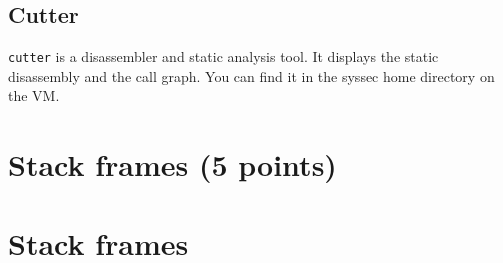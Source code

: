 \documentclass[a4paper,11pt]{article}
\begin{document}
\subsection*{Cutter}

\texttt{cutter} is a disassembler and static analysis tool. It displays the static disassembly and the call graph. You can find it in the syssec home directory on the VM.

\ifsolution 
\section*{Stack frames (5 points)}
\else
\section*{Stack frames}
\fi
\end{document}

